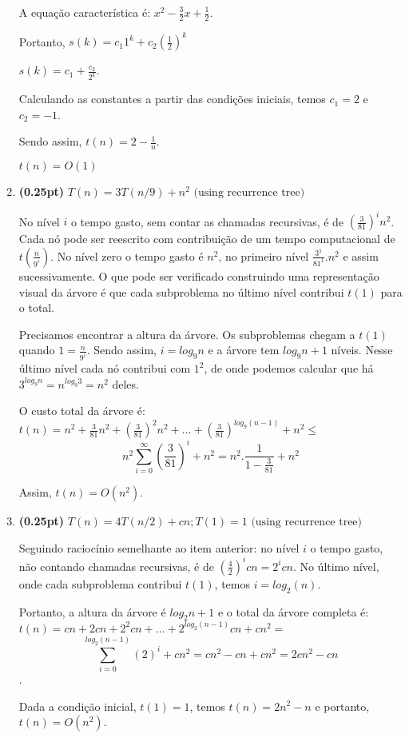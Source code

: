\documentclass{article}
\begin{document}
\begin{enumerate}[label=\Alph*]
  A equação característica é:
  $x^{2} - \frac{3}{2}x + \frac{1}{2}$.
  
  Portanto, $s(k) = c_{1}1^{k} + c_{2}(\frac{1}{2})^{k}$
  
  $s(k) = c_{1} + \frac{c_{2}}{2^{k}}$.
  
  Calculando as constantes a partir das condições iniciais, temos $c_{1} = 2$ e $c_{2} = -1$.
  
  Sendo assim, $t(n) = 2 - \frac{1}{n}$.
  
  $t(n) = O(1)$
  
  \item \textbf{(0.25pt)} $T(n) = 3T(n/9) + n^2 \mbox{ (using recurrence tree)}$
  
    No nível $i$ o tempo gasto, sem contar as chamadas recursivas, é de $(\frac{3}{81})^{i}n^{2}$. Cada nó pode ser reescrito com contribuição de um tempo computacional de $t(\frac{n}{9^{i}})$. No nível zero o tempo gasto é $n^{2}$, no primeiro nível $\frac{3^{1}}{81^{1}}. n^{2}$ e assim sucessivamente. O que pode ser verificado construindo uma representação visual da árvore é que cada subproblema no último nível contribui $ t(1)$ para o total.
    
    Precisamos encontrar a altura da árvore. Os subproblemas chegam a $ t(1)$ quando $1 = \frac{n}{9^{i}}$. Sendo assim, $i = log_{9} n$ e a árvore tem $log_{9}n + 1$ níveis. Nesse último nível cada nó contribui com $1^{2}$, de onde podemos calcular que há $3^{log_{9}n} = n^{log_{9}3} = n^{2} $ deles.
    
    O custo total da árvore é: $t(n) = n^{2} + \frac{3}{81}n^{2} + (\frac{3}{81})^{2}n^{2} + ... + (\frac{3}{81})^{log_{9}(n-1)} + n^{2} \leq $ $$ n^{2} \sum_{i=0}^{\infty} (\frac{3}{81})^{i} + n^{2} = n^{2}.\frac{1}{1 - \frac{3}{81}} + n^{2}$$
    
    Assim, $t(n) = O(n^{2})$.
      
  \item \textbf{(0.25pt)} $T(n) = 4T(n/2) + cn; T(1)=1  \mbox{ (using recurrence tree)}$
  
  Seguindo raciocínio semelhante ao item anterior: no nível $i$ o tempo gasto, não contando chamadas recursivas, é de $(\frac{4}{2})^{i}cn = 2^{i}cn$. No último nível, onde cada subproblema contribui $t(1)$, temos $ i = log_{2}(n)$. 
  
  Portanto, a altura da árvore é $log_{2}n + 1$ e o total da árvore completa é:
  $t(n) = cn + 2cn + 2^{2}cn + ... + 2^{log_{2}(n-1)}cn + cn^{2}  =$ $$ \sum_{i=0}^{log_{2}(n - 1)}(2)^{i} + cn^{2} = cn^{2} - cn + cn^{2} = 2cn^{2} - cn$$.
  
  Dada a condição inicial, $t(1) =1$, temos $t(n) = 2n^{2} - n $ e portanto, $t(n) = O(n^{2})$.
  
\end{enumerate}
\end{document}
